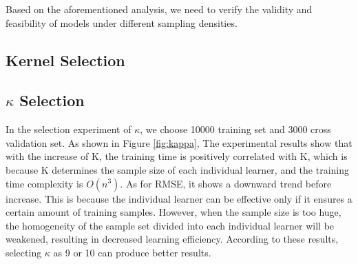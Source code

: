 \documentclass[twoside,leqno,twocolumn]{article}
\begin{document}
Based on the aforementioned analysis, we need to verify the validity and feasibility of models under different sampling densities.
%
\subsection{Kernel Selection}
%
%
\subsection{$\kappa$ Selection}
In the selection experiment of $\kappa$, we choose 10000 training set and 3000 cross validation set. As shown in Figure \ref{fig:kappa}, The experimental results show that with the increase of K, the training time is positively correlated with K, which is because K determines the sample size of each individual learner, and the training time complexity is $O(n^3)$. As for RMSE, it shows a downward trend before increase. This is because the individual learner can be effective only if it ensures a certain amount of training samples. However, when the sample size is too huge, the homogeneity of the sample set divided into each individual learner will be weakened, resulting in decreased learning efficiency. According to these results, selecting $\kappa$ as 9 or 10 can produce better results.
\end{document}
